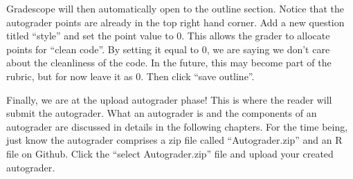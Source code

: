 \documentclass[
]{article}
\begin{document}
Gradescope will then automatically open to the outline section. Notice
that the autograder points are already in the top right hand corner. Add
a new question titled ``style'' and set the point value to 0. This
allows the grader to allocate points for ``clean code''. By setting it
equal to 0, we are saying we don't care about the cleanliness of the
code. In the future, this may become part of the rubric, but for now
leave it as 0. Then click ``save outline''.

\begin{center}
\end{center}

Finally, we are at the upload autograder phase! This is where the reader
will submit the autograder. What an autograder is and the components of
an autograder are discussed in details in the following chapters. For
the time being, just know the autograder comprises a zip file called
``Autograder.zip'' and an R file on Github. Click the ``select
Autograder.zip'' file and upload your created autograder.

\begin{center}
\end{center}
\end{document}
